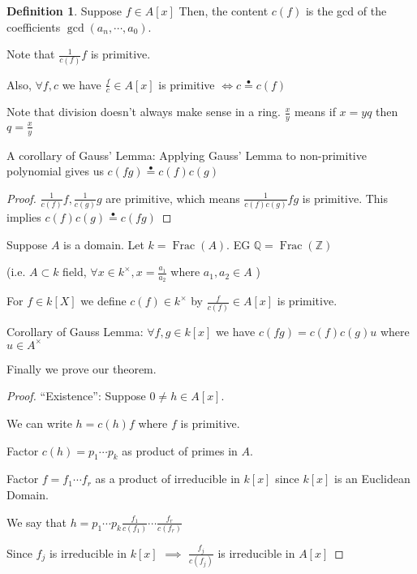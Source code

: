 \documentclass{article}
\theoremstyle{definition}
\newtheorem{definition}{Definition}
\newcommand{\Frac}{\operatorname{Frac}}
\begin{document}
\begin{definition}
    Suppose \(f\in A[x]\) Then, the content \(c(f)\) is the gcd of the coefficients \(\gcd(a_n,\cdots,a_0)\).  
\end{definition}

Note that \(\frac{1}{c(f)}f\) is primitive.

Also, \(\forall f,c\) we have \(\frac{f}{c}\in A[x]\) is primitive \(\iff c\overset{\bullet}{=} c(f)\) 

Note that division doesn't always make sense in a ring. \(\frac{x}{y}\) means if \(x=yq\) then \(q=\frac{x}{y}\) 

A corollary of Gauss' Lemma: Applying Gauss' Lemma to non-primitive polynomial gives us \(c(fg)\overset{\bullet}{=} c(f)c(g)\) 

\begin{proof}
    \(\frac{1}{c(f)}f,\frac{1}{c(g)}g\) are primitive, which means \(\frac{1}{c(f)c(g)}fg\) is primitive. This implies \(c(f)c(g)\overset{\bullet}{=} c(fg)\) 
\end{proof}

Suppose \(A\) is a domain. Let \(k=\Frac(A)\). EG \(\mathbb{Q} =\Frac(\mathbb{Z} )\) 

(i.e. \(A\subset k\) field, \(\forall x\in k^\times, x=\frac{a_1}{a_2}\) where \(a_1,a_2\in A\) )

For \(f\in k[X]\) we define \(c(f)\in k^\times \) by \(\frac{f}{c(f)}\in A[x]\) is primitive.

Corollary of Gauss Lemma: \(\forall f,g\in k[x]\) we have \(c(fg)=c(f)c(g)u\) where \(u\in A^\times\)

Finally we prove our theorem.

\begin{proof}
    ``Existence'': Suppose \(0\neq h\in A[x]\).

    We can write \(h=c(h)f\) where \(f\) is primitive.

    Factor \(c(h)=p_1\cdots p_k\) as product of primes in \(A\).

    Factor \(f=f_1\cdots f_r\) as a product of irreducible in \(k[x]\) since \(k[x]\) is an Euclidean Domain.

    We say that \(h = p_1\cdots p_k \frac{f_1}{c(f_1)}\cdots \frac{f_r}{c(f_r)}\) 

    Since \(f_j\) is irreducible in \(k[x]\) \(\implies\) \(\frac{f_j}{c(f_j)}\) is irreducible in \(A[x]\)  

\end{proof}
\end{document}
